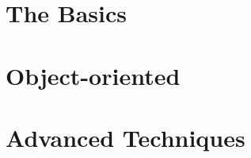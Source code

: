 \documentclass[11pt,fleqn]{book} %
\begin{document}



\pagestyle{empty} %

\tableofcontents %

\cleardoublepage %

\pagestyle{fancy} %






\part{The Basics}







	











\part{Object-oriented}










\part{Advanced Techniques}









\end{document}
